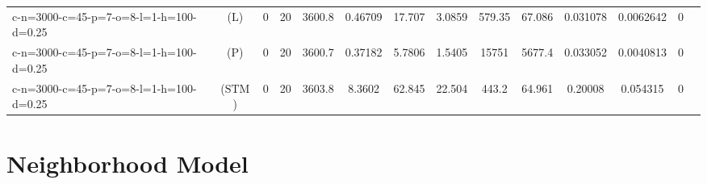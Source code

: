\documentclass[landscape, a4paper]{article}
\newcommand{\STM}{\ensuremath{\mathrm{STM}}}
\newcommand{\Loose}{\ensuremath{\mathrm{L}}}
\newcommand{\Profit}{\ensuremath{\mathrm{P}}}
\begin{document}
\begin{center}
\begin{tabular}{lccccccccccccc}
c-n=3000-c=45-p=7-o=8-l=1-h=100-d=0.25 & (\Loose) & 0 & 20 & 3600.8 & 0.46709 & 17.707 & 3.0859 & 579.35 & 67.086 & 0.031078 & 0.0062642 & 0 & \\
c-n=3000-c=45-p=7-o=8-l=1-h=100-d=0.25 & (\Profit) & 0 & 20 & 3600.7 & 0.37182 & 5.7806 & 1.5405 & 15751 & 5677.4 & 0.033052 & 0.0040813 & 0 & \\
c-n=3000-c=45-p=7-o=8-l=1-h=100-d=0.25 & (\STM) & 0 & 20 & 3603.8 & 8.3602 & 62.845 & 22.504 & 443.2 & 64.961 & 0.20008 & 0.054315 & 0 & \\
\end{tabular}
\end{center}

\newpage
\section{Neighborhood Model}
\end{document}

